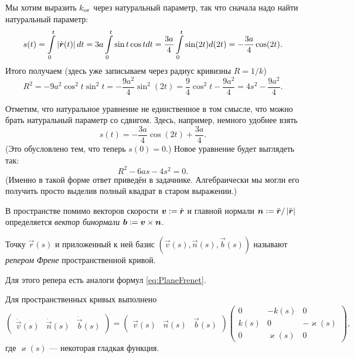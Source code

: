 \begin{solution}
	Мы хотим выразить $k_{\Or}$ через натуральный параметр, так что сначала надо найти натуральный параметр:
	\[
		s(t) = \int\limits_0^t\abs{\dot{\vec{r}}(t)}dt = 3a\int\limits_0^t\sin t\cos tdt = \frac{3a}{4}\int\limits_0^t\sin(2t) d(2t) = -\frac{3a}{4}\cos(2t).
	\]
	Итого получаем (здесь уже записываем через радиус кривизны $R = 1 / k$)
	\[
		R^2 = -9a^2\cos^2t\sin^2t = -\frac{9a^2}{4}\sin^2(2t) = \frac{9}{4}\cos^2t - \frac{9a^2}{4} = 4s^2 - \frac{9a^2}{4}.
	\]

	Отметим, что натуральное уравнение не единственное в том смысле, что можно брать натуральный параметр со сдвигом. Здесь, например, немного удобнее взять
	\[
		s(t) = -\frac{3a}{4}\cos(2t) + \frac{3a}{4}.
	\]
	(Это обусловлено тем, что теперь $s(0) = 0$.) Новое уравнение будет выглядеть так:
	\[
		R^2 - 6as - 4s^2 = 0.
	\]
	(Именно в такой форме ответ приведён в задачнике. Алгебраически мы могли его получить просто выделив полный квадрат в старом выражении.)
\end{solution}

В пространстве помимо векторов скорости $\vec{v} \vcentcolon = \dot{\vec{r}}$ и главной нормали $\vec{n} \vcentcolon = \ddot{\vec{r}} / \abs{\ddot{\vec{r}}}$ определяется \textit{вектор бинормали} $\vec{b} \vcentcolon = \vec{v} \times \vec{n}$.

\begin{definition}
	Точку $\vec{r}(s)$ и приложенный к ней базис $(\vec{v}(s), \vec{n}(s), \vec{b}(s))$ называют \textit{репером Френе} пространственной кривой.
\end{definition}

Для этого репера есть аналоги формул \eqref{eq:PlaneFrenet}.

\begin{theorem}
	Для пространственных кривых выполнено
	\begin{equation} \label{eq:SpaceFrenet}
		\begin{pmatrix}
			\dot{\vec{v}}(s) & \dot{\vec{n}}(s) & \dot{\vec{b}}(s)
		\end{pmatrix} = 
		\begin{pmatrix}
			\vec{v}(s) & \vec{n}(s) & \vec{b}(s)
		\end{pmatrix}
		\begin{pmatrix}
			0 & -k(s) & 0 \\
			k(s) & 0 & -\varkappa(s) \\
			0 & \varkappa(s) & 0
		\end{pmatrix},
	\end{equation}
	где $\varkappa(s)$ --- некоторая гладкая функция.
\end{theorem}

